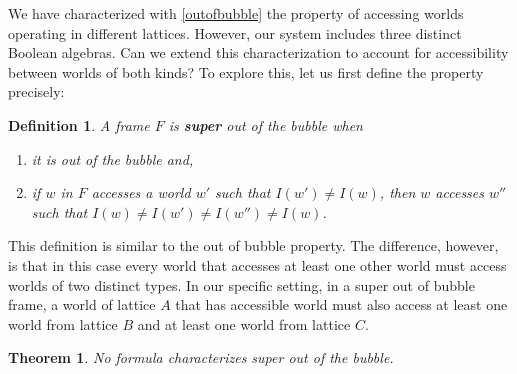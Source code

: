 \documentclass{amsart}
\newtheorem{definition}{Definition}[section]
\newtheorem{theorem}{Theorem}[section]
\begin{document}
We have characterized with \cref{outofbubble} the property of accessing worlds operating in different lattices. However, our system includes three distinct Boolean algebras. Can we extend this characterization to account for accessibility between worlds of both kinds? To explore this, let us first define the property precisely:


\begin{definition}
    A frame $F$ is \textbf{super} out of the bubble when 
    \begin{enumerate}
        \item it is out of the bubble and,
        \item if $w$ in $F$ accesses a world $w'$ such that $I(w') \neq I(w)$, then $w$ accesses $w''$ such that  $I(w) \neq I(w') \neq I(w'') \neq I(w)$.
    \end{enumerate}
\end{definition}

This definition is similar to the out of bubble property. The difference, however, is that in this case every world that accesses at least one other world must access worlds of two distinct types. In our specific setting, in a super out of bubble frame, a world of lattice $A$ that has accessible world must also access at least one world from lattice $B$ and at least one world from lattice $C$.

\begin{theorem}\label{soobNotCharacterizable}
    No formula characterizes super out of the bubble.
\end{theorem}
\end{document}
